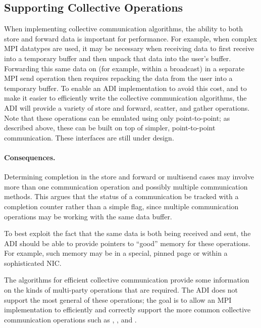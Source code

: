 \subsection{Supporting Collective Operations}
When implementing collective communication algorithms, the ability to
both store and forward data is important for performance.  For
example, when complex MPI datatypes are used, it may be necessary when
receiving data to first receive into a temporary buffer and then
unpack that data into the user's buffer.  Forwarding this same data on
(for example, within a broadcast) in a separate MPI send operation
then requires repacking the data from the user into a temporary
buffer.  To enable an ADI implementation to avoid this cost, and to
make it easier to efficiently write the collective communication
algorithms, the ADI will provide a variety of store and forward, scatter,
and gather operations.  Note that these operations can be emulated
using only point-to-point; as described above, these can be built on
top of simpler, point-to-point communication.  These interfaces are
still under design.


\paragraph{Consequences.}
Determining completion in the store and forward or multisend cases may involve
more than one communication 
operation and possibly multiple communication methods.  This argues
that the status of a communication be tracked with a completion
counter rather than a simple flag, since multiple communication
operations may be working with the same data buffer.  

To best exploit the fact that the same data is both being received and
sent, the ADI should be able to provide pointers to ``good'' memory
for these operations.  For example, such memory may be in a special,
pinned page or within a sophisticated NIC.  

The algorithms for efficient collective communication provide some
information on the kinds of multi-party operations that are required.
The ADI does not support the most general of these operations; the
goal is to allow an MPI implementation to efficiently and correctly
support the more common collective communication operations such as
, , and .

